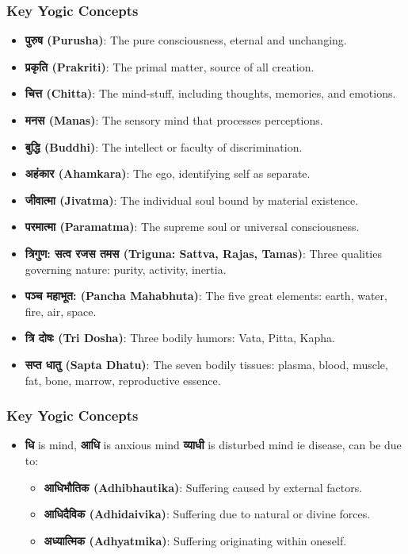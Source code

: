\begin{frame}[fragile]\frametitle{Key Yogic Concepts}
      \begin{itemize}
        \item \textbf{पुरुष (Purusha)}: The pure consciousness, eternal and unchanging.
        \item \textbf{प्रकृति (Prakriti)}: The primal matter, source of all creation.
        \item \textbf{चित्त (Chitta)}: The mind-stuff, including thoughts, memories, and emotions.
        \item \textbf{मनस (Manas)}: The sensory mind that processes perceptions.
        \item \textbf{बुद्धि (Buddhi)}: The intellect or faculty of discrimination.
        \item \textbf{अहंकार (Ahamkara)}: The ego, identifying self as separate.
        \item \textbf{जीवात्मा (Jivatma)}: The individual soul bound by material existence.
        \item \textbf{परमात्मा (Paramatma)}: The supreme soul or universal consciousness.
        \item \textbf{त्रिगुण: सत्व रजस तमस (Triguna: Sattva, Rajas, Tamas)}: Three qualities governing nature: purity, activity, inertia.
        \item \textbf{पञ्च महाभूत: (Pancha Mahabhuta)}: The five great elements: earth, water, fire, air, space.
        \item \textbf{त्रि दोषः (Tri Dosha)}: Three bodily humors: Vata, Pitta, Kapha.
        \item \textbf{सप्त धातु (Sapta Dhatu)}: The seven bodily tissues: plasma, blood, muscle, fat, bone, marrow, reproductive essence.
      \end{itemize}
\end{frame}

\begin{frame}[fragile]\frametitle{Key Yogic Concepts}
      \begin{itemize}
		\item \textbf{धि} is mind, \textbf{आधि} is anxious mind \textbf{व्याधी } is disturbed mind ie disease, can be due to:
		\begin{itemize}
			\item \textbf{आधिभौतिक (Adhibhautika)}: Suffering caused by external factors.
			\item \textbf{आधिदैविक (Adhidaivika)}: Suffering due to natural or divine forces.
			\item \textbf{अध्यात्मिक (Adhyatmika)}: Suffering originating within oneself.
		\end{itemize}

      \end{itemize}
\end{frame}
